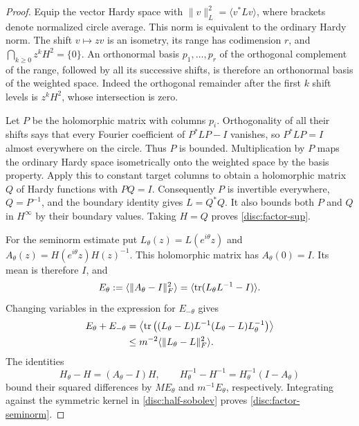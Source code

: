 \begin{proof}
Equip the vector Hardy space with
$\|v\|_L^2=\langle v^*Lv\rangle$, where brackets denote normalized
circle average.  This norm is equivalent to the ordinary Hardy norm.
The shift $v\mapsto zv$ is an isometry, its range has codimension
$r$, and $\bigcap_{k\ge0}z^kH^2=\{0\}$.  An orthonormal basis
$p_1,\ldots,p_r$ of the orthogonal complement of the range, followed
by all its successive shifts, is therefore an orthonormal basis of
the weighted space.  Indeed the orthogonal remainder after the first
$k$ shift levels is $z^kH^2$, whose intersection is zero.

Let $P$ be the holomorphic matrix with columns $p_i$.  Orthogonality
of all their shifts says that every Fourier coefficient of
$P^*LP-I$ vanishes, so $P^*LP=I$ almost everywhere on the circle.
Thus $P$ is bounded.  Multiplication by $P$ maps the ordinary Hardy
space isometrically onto the weighted space by the basis property.
Apply this to constant target columns to obtain a holomorphic matrix
$Q$ of Hardy functions with $PQ=I$.  Consequently $P$ is invertible
everywhere, $Q=P^{-1}$, and the boundary identity gives $L=Q^*Q$.
It also bounds both $P$ and $Q$ in $H^\infty$ by their boundary
values.  Taking $H=Q$ proves \eqref{disc:factor-sup}.

For the seminorm estimate put
$L_\theta(z)=L(e^{i\theta}z)$ and
$A_\theta(z)=H(e^{i\theta}z)H(z)^{-1}$.  This holomorphic matrix
has $A_\theta(0)=I$.  Its mean is therefore $I$, and
\[
 E_\theta:=\langle\|A_\theta-I\|_F^2\rangle
       =\langle\operatorname{tr}(L_\theta L^{-1}-I)\rangle.
\]
Changing variables in the expression for $E_{-\theta}$ gives
\begin{align*}
 E_\theta+E_{-\theta}
 &=\left\langle\operatorname{tr}\big((L_\theta-L)L^{-1}
                      (L_\theta-L)L_\theta^{-1}\big)\right\rangle\\
 &\le m^{-2}\langle\|L_\theta-L\|_F^2\rangle.
\end{align*}
The identities
\[
 H_\theta-H=(A_\theta-I)H,\qquad
 H_\theta^{-1}-H^{-1}=H_\theta^{-1}(I-A_\theta)
\]
bound their squared differences by $ME_\theta$ and
$m^{-1}E_\theta$, respectively.  Integrating against the symmetric
kernel in \eqref{disc:half-sobolev} proves
\eqref{disc:factor-seminorm}.


\end{proof}
